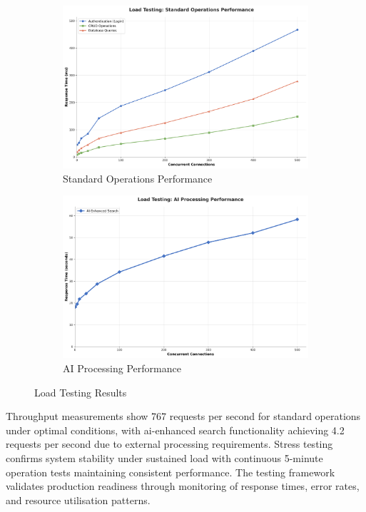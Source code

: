 \begin{figure}[htbp]
    \centering
    \begin{subfigure}[t]{0.48\textwidth}
        \centering
        \includegraphics[width=\textwidth]{figs/chapter5/load_testing_standard.png}
        \caption{Standard Operations Performance}
        \label{fig:load_testing_standard}
    \end{subfigure}
    \hfill
    \begin{subfigure}[t]{0.48\textwidth}
        \centering
        \includegraphics[width=\textwidth]{figs/chapter5/load_testing_ai.png}
        \caption{AI Processing Performance}
        \label{fig:load_testing_ai}
    \end{subfigure}
    \caption{Load Testing Results}
    \label{fig:load_testing_results}
\end{figure}

Throughput measurements show 767 requests per second for standard operations under optimal conditions, with \ac{ai}-enhanced search functionality achieving 4.2 requests per second due to external processing requirements. Stress testing confirms system stability under sustained load with continuous 5-minute operation tests maintaining consistent performance. The testing framework validates production readiness through monitoring of response times, error rates, and resource utilisation patterns.

